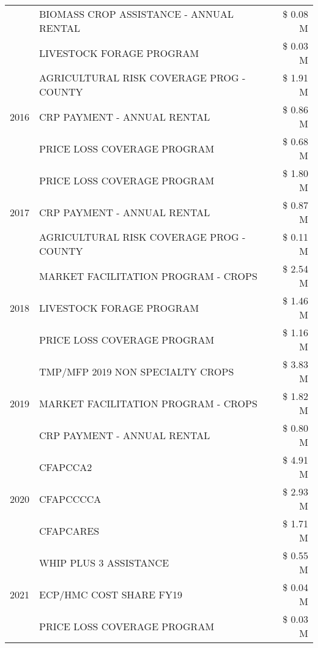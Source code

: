 \begin{tabular}{llr}
 & BIOMASS CROP ASSISTANCE - ANNUAL RENTAL & \$ 0.08 M \\
 & LIVESTOCK FORAGE PROGRAM & \$ 0.03 M \\
\cline{1-3}
\multirow[t]{3}{*}{2016} & AGRICULTURAL RISK COVERAGE PROG - COUNTY & \$ 1.91 M \\
 & CRP PAYMENT - ANNUAL RENTAL & \$ 0.86 M \\
 & PRICE LOSS COVERAGE PROGRAM & \$ 0.68 M \\
\cline{1-3}
\multirow[t]{3}{*}{2017} & PRICE LOSS COVERAGE PROGRAM & \$ 1.80 M \\
 & CRP PAYMENT - ANNUAL RENTAL & \$ 0.87 M \\
 & AGRICULTURAL RISK COVERAGE PROG - COUNTY & \$ 0.11 M \\
\cline{1-3}
\multirow[t]{3}{*}{2018} & MARKET FACILITATION PROGRAM - CROPS & \$ 2.54 M \\
 & LIVESTOCK FORAGE PROGRAM & \$ 1.46 M \\
 & PRICE LOSS COVERAGE PROGRAM & \$ 1.16 M \\
\cline{1-3}
\multirow[t]{3}{*}{2019} & TMP/MFP 2019 NON SPECIALTY CROPS & \$ 3.83 M \\
 & MARKET FACILITATION PROGRAM - CROPS & \$ 1.82 M \\
 & CRP PAYMENT - ANNUAL RENTAL & \$ 0.80 M \\
\cline{1-3}
\multirow[t]{3}{*}{2020} & CFAPCCA2 & \$ 4.91 M \\
 & CFAPCCCCA & \$ 2.93 M \\
 & CFAPCARES & \$ 1.71 M \\
\cline{1-3}
\multirow[t]{3}{*}{2021} & WHIP PLUS 3 ASSISTANCE & \$ 0.55 M \\
 & ECP/HMC COST SHARE FY19 & \$ 0.04 M \\
 & PRICE LOSS COVERAGE PROGRAM & \$ 0.03 M \\
\cline{1-3}
\bottomrule
\end{tabular}
